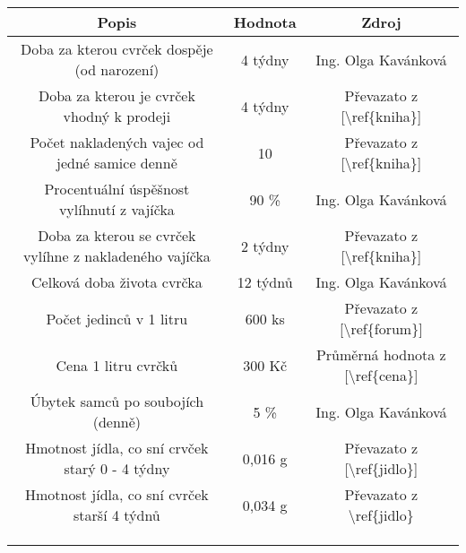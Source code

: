 \documentclass{article}
\begin{document}
    \begin{table}[h]
        \begin{tabular}{|c|c|c|}
        \hline
        \textbf{Popis}                                         & \textbf{Hodnota}      & \textbf{Zdroj}                                       \\ \hline
        Doba za kterou cvrček dospěje (od narození)            & 4 týdny               & Ing. Olga Kavánková                                  \\ \hline
        Doba za kterou je cvrček vhodný k prodeji              & 4 týdny               & Převazato z {[}\textbackslash{}ref\{kniha\}{]}       \\ \hline
        Počet nakladených vajec od jedné samice denně          & 10                    & Převazato z {[}\textbackslash{}ref\{kniha\}{]}       \\ \hline
        Procentuální úspěšnost vylíhnutí z vajíčka             & 90 \%                 & Ing. Olga Kavánková                                  \\ \hline
        Doba za kterou se cvrček vylíhne z nakladeného vajíčka & 2 týdny               & Převazato z {[}\textbackslash{}ref\{kniha\}{]}       \\ \hline
        Celková doba života cvrčka                             & 12 týdnů              & Ing. Olga Kavánková                                  \\ \hline
        Počet jedinců v 1 litru                                & 600 ks                & Převazato z {[}\textbackslash{}ref\{forum\}{]}       \\ \hline
        Cena 1 litru cvrčků                                    & 300 Kč                & Průměrná hodnota z {[}\textbackslash{}ref\{cena\}{]} \\ \hline
        Úbytek samců po soubojích (denně)                      & 5 \%                  & Ing. Olga Kavánková                                  \\ \hline
        Hmotnost jídla, co sní crvček starý 0 - 4 týdny        & 0,016 g               & Převazato z {[}\textbackslash{}ref\{jidlo\}{]}       \\ \hline
        Hmotnost jídla, co sní cvrček starší 4 týdnů           & 0,034 g               & Převazato z \textbackslash{}ref\{jidlo\}             \\ \hline
        \multicolumn{1}{|l|}{}                                 & \multicolumn{1}{l|}{} & \multicolumn{1}{l|}{}                                \\ \hline
        \multicolumn{1}{|l|}{}                                 & \multicolumn{1}{l|}{} & \multicolumn{1}{l|}{}                                \\ \hline
        \multicolumn{1}{|l|}{}                                 & \multicolumn{1}{l|}{} & \multicolumn{1}{l|}{}                                \\ \hline
        \end{tabular}
    \end{table}
\end{document}

